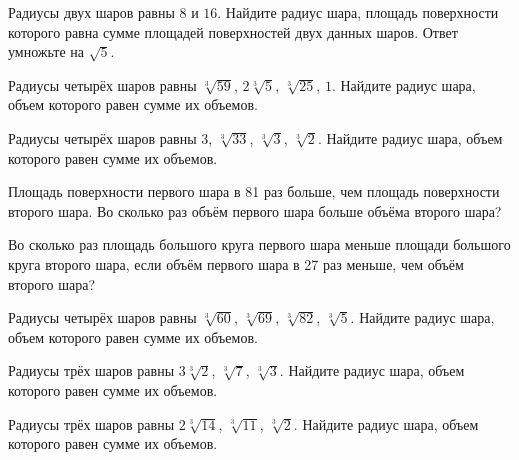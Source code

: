 \documentclass[a4paper]{article}
\begin{document}
\begin{taskBN}{80}
Радиусы двух шаров равны $8$ и $16$. Найдите радиус шара, площадь поверхности которого равна сумме площадей поверхностей двух данных шаров. Ответ умножьте на $\sqrt{5}$.
\end{taskBN}

\begin{taskBN}{81}
Радиусы четырёх шаров равны $\sqrt[3]{59}$, $2\sqrt[3]{5}$, $\sqrt[3]{25}$, $1$. Найдите радиус шара, объем которого равен сумме их объемов.
\end{taskBN}

\begin{taskBN}{82}
Радиусы четырёх шаров равны $3$, $\sqrt[3]{33}$, $\sqrt[3]{3}$, $\sqrt[3]{2}$. Найдите радиус шара, объем которого равен сумме их объемов.
\end{taskBN}

\begin{taskBN}{83}
Площадь поверхности первого шара в 81 раз больше, чем площадь поверхности второго шара. Во сколько раз объём первого шара больше объёма второго шара?
\end{taskBN}

\begin{taskBN}{84}
Во сколько раз площадь большого круга первого шара меньше площади большого круга второго шара, если объём первого шара в 27 раз меньше, чем объём второго шара?
\end{taskBN}

\begin{taskBN}{85}
Радиусы четырёх шаров равны $\sqrt[3]{60}$, $\sqrt[3]{69}$, $\sqrt[3]{82}$, $\sqrt[3]{5}$. Найдите радиус шара, объем которого равен сумме их объемов.
\end{taskBN}

\begin{taskBN}{86}
Радиусы трёх шаров равны $3\sqrt[3]{2}$, $\sqrt[3]{7}$, $\sqrt[3]{3}$. Найдите радиус шара, объем которого равен сумме их объемов.
\end{taskBN}

\begin{taskBN}{87}
Радиусы трёх шаров равны $2\sqrt[3]{14}$, $\sqrt[3]{11}$, $\sqrt[3]{2}$. Найдите радиус шара, объем которого равен сумме их объемов.
\end{taskBN}
\end{document}
